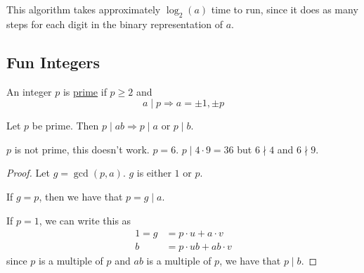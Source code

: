 This algorithm takes approximately $\log_2(a)$ time to run, since it does as many steps for each digit in the binary representation of $a$.

\subsection{Fun Integers}
\recall An integer $p$ is \ul{prime} if $p\geq 2$ and
\[a\mid p\Rightarrow a = \pm 1, \pm p\]

\begin{proposition}
    Let $p$ be prime. Then $p\mid ab\Rightarrow p\mid a$ or $p\mid b$.
\end{proposition}
\begin{example}
    $p$ is not prime, this doesn't work. $p = 6$. $p\mid 4\cdot 9 = 36$
    but $6\nmid 4$ and $6\nmid 9$.
\end{example}

\begin{proof}
    Let $g = \gcd(p, a)$. $g$ is either $1$ or $p$.

    If $g = p$, then we have that $p = g\mid a$.

    If $p = 1$, we can write this as
    \begin{align*}
        1 = g & = p\cdot u + a\cdot v   \\
        b     & = p\cdot ub + ab\cdot v
    \end{align*}
    since $p$ is a multiple of $p$ and $ab$ is a multiple of $p$, we have that $p\mid b$.
\end{proof}

